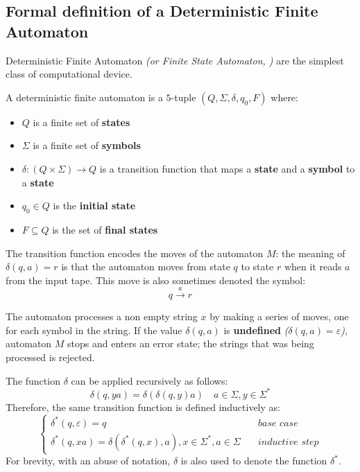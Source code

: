 \documentclass[english]{article}
\begin{document}
\subsection{Formal definition of a Deterministic Finite Automaton}

Deterministic Finite Automaton \textit{(or Finite State Automaton, \FSA)} are the simplest class of computational device.

A deterministic finite automaton is a \(5\)-tuple \((Q, \Sigma, \delta, q_0, F)\) where:

\begin{itemize}
  \item \(Q\) is a finite set of \textbf{states}
  \item \(\Sigma\) is a finite set of \textbf{symbols}
  \item \(\delta: \left( Q \times \Sigma \right) \rightarrow Q\) is a transition function that maps a \textbf{state} and a \textbf{symbol} to a \textbf{state}
  \item \(q_0 \in Q\) is the\textbf{ initial state}
  \item \(F \subseteq Q\) is the set of \textbf{final states}
\end{itemize}

The transition function encodes the moves of the automaton \(M\): the meaning of \(\delta(q, a) = r\) is that the automaton moves from state \(q\) to state \(r\) when it reads \(a\) from the input tape.
This move is also sometimes denoted the symbol: \[q \xrightarrow{a} r\]

The automaton processes a non empty string \(x\) by making a series of moves, one for each symbol in the string.
If the value \(\delta(q, a)\) is \textbf{undefined} \textit{(\(\delta(q, a) = \varepsilon\))}, automaton \(M\) stops and enters an error state;
the strings that was being processed is rejected.

The function \(\delta\) can be applied recursively as follows:
\[ \delta(q, ya) = \delta \left(  \delta \left( q, y \right) a \right) \quad a \in \Sigma, y \in \Sigma^\ast \]
Therefore, the same transition function is defined inductively as:
\[\begin{cases}
    \delta^\ast\left( q, \varepsilon \right) = q \quad                                                                   & \textit{base case}      \\
    \delta^\ast\left( q, xa \right) = \delta \left( \delta^\ast (q, x), a \right), x \in \Sigma^\ast, a \in \Sigma \quad & \textit{inductive step}
  \end{cases}\]
For brevity, with an abuse of notation, \(\delta\) is also used to denote the function \(\delta^\ast\).
\end{document}
